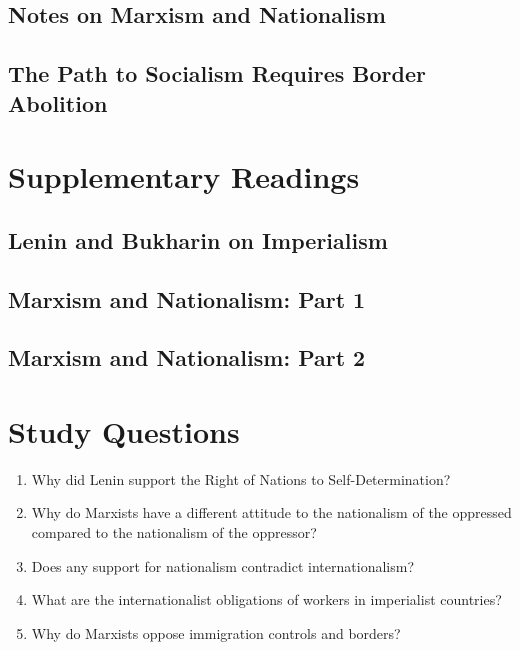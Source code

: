 \documentclass[12pt,a4paper]{report}
\begin{document}
\subsection{Notes on Marxism and Nationalism}

\clearpage

\subsection{The Path to Socialism Requires Border Abolition}

\clearpage

\section{Supplementary Readings}
\subsection{Lenin and Bukharin on Imperialism}

\clearpage

\subsection{Marxism and Nationalism: Part 1}

\clearpage

\subsection{Marxism and Nationalism: Part 2}


\section{Study Questions}
\begin{enumerate}
	\item Why did Lenin support the Right of Nations to Self-Determination?
	\item Why do Marxists have a different attitude to the nationalism of the oppressed compared to the nationalism of the oppressor?
	\item Does any support for nationalism contradict internationalism?
	\item What are the internationalist obligations of workers in imperialist countries?
	\item Why do Marxists oppose immigration controls and borders?
\end{enumerate}
\clearpage
\end{document}
